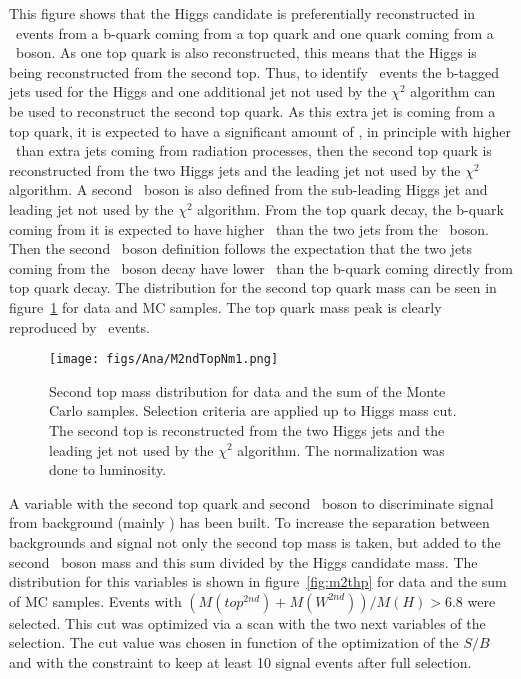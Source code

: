 This figure shows that the Higgs candidate is preferentially reconstructed in \ttbar~events from a b-quark coming from a top quark and one quark coming from a \W~boson. As one top quark is also reconstructed, this means that the Higgs is being reconstructed from the second top. Thus, to identify \ttbar~events the b-tagged jets used for the Higgs and one additional jet not used by the $\chi^{2}$ algorithm can be used to reconstruct the second top quark. As this extra jet is coming from a top quark, it is expected to have a significant amount of \pt, in principle with higher \pt~than extra jets coming from radiation processes, then the second top quark is reconstructed from the two Higgs jets and the leading jet not used by the $\chi^{2}$ algorithm. A second \W~boson is also defined from the sub-leading Higgs jet and leading jet not used by the $\chi^{2}$ algorithm. From the top quark decay, the b-quark coming from it is expected to have higher \pt~than the two jets from the \W~boson. Then the second \W~boson definition follows the expectation that the two jets coming from the \W~boson decay have lower \pt~than the b-quark coming directly from top quark decay. The distribution for the second top quark mass can be seen in figure~\ref{fig:2ndTM} for data and MC samples. The top quark mass peak is clearly reproduced by \ttbar~events.

\begin{figure}[!Hhtbp]
  \begin{center}
    \texttt{[image: figs/Ana/M2ndTopNm1.png]}
    \caption{Second top mass distribution for data and the sum of the Monte Carlo samples. Selection criteria are applied up to Higgs mass cut. The second top is reconstructed from the two Higgs jets and the leading jet not used by the $\chi^{2}$ algorithm. The normalization was done to luminosity.}
    \label{fig:2ndTM}
  \end{center}
\end{figure}

A variable with the second top quark and second \W~boson to discriminate signal from background (mainly \ttbar) has been built. To increase the separation between backgrounds and signal not only the second top mass is taken, but added to the second \W~boson mass and this sum divided by the Higgs candidate mass. The distribution for this variables is shown in figure~\ref{fig:m2thp} for data and the sum of MC samples. Events with $(M(top^{2nd})+M(W^{2nd}))/M(H)>6.8$ were selected. This cut was optimized via a scan with the two next variables of the selection. The cut value was chosen in function of the optimization of the $S/B$ and with the constraint to keep at least 10 signal events after full selection. 

